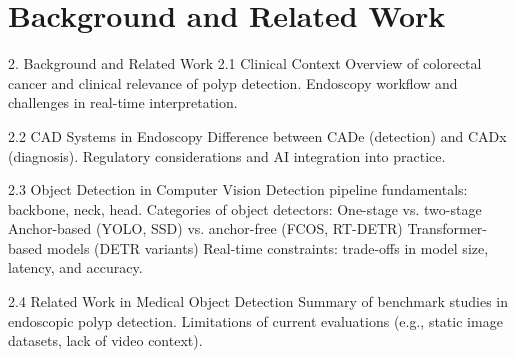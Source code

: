 \section{Background and Related Work}
\label{sec:bg_rw}

2. Background and Related Work
    2.1 Clinical Context
        Overview of colorectal cancer and clinical relevance of polyp detection.
        Endoscopy workflow and challenges in real-time interpretation.

    2.2 CAD Systems in Endoscopy
        Difference between CADe (detection) and CADx (diagnosis).
        Regulatory considerations and AI integration into practice.

    2.3 Object Detection in Computer Vision
        Detection pipeline fundamentals: backbone, neck, head.
        Categories of object detectors:
            One-stage vs. two-stage
            Anchor-based (YOLO, SSD) vs. anchor-free (FCOS, RT-DETR)
            Transformer-based models (DETR variants)
        Real-time constraints: trade-offs in model size, latency, and accuracy.

    2.4 Related Work in Medical Object Detection
        Summary of benchmark studies in endoscopic polyp detection.
        Limitations of current evaluations (e.g., static image datasets, lack of video context).